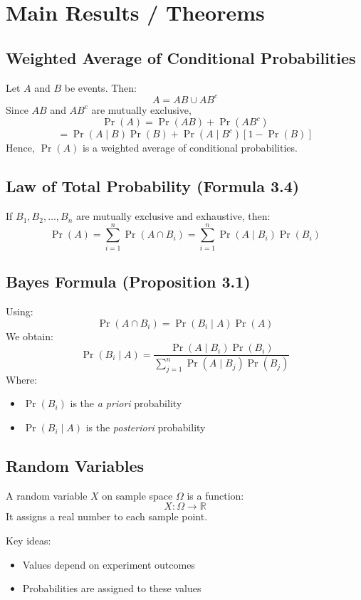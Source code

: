 \documentclass[12pt]{article}
\begin{document}
\section{Main Results / Theorems}

\subsection{Weighted Average of Conditional Probabilities}
Let $A$ and $B$ be events. Then:
\[
A = AB \cup AB^c
\]
Since $AB$ and $AB^c$ are mutually exclusive,
\[
\Pr(A) = \Pr(AB) + \Pr(AB^c)
\]
\[
= \Pr(A \mid B)\Pr(B) + \Pr(A \mid B^c)[1 - \Pr(B)]
\]
Hence, $\Pr(A)$ is a weighted average of conditional probabilities.

\subsection{Law of Total Probability (Formula 3.4)}
If $B_1, B_2, \dots, B_n$ are mutually exclusive and exhaustive, then:
\[
\Pr(A) = \sum_{i=1}^n \Pr(A \cap B_i)
= \sum_{i=1}^n \Pr(A \mid B_i)\Pr(B_i)
\]

\subsection{Bayes Formula (Proposition 3.1)}
Using:
\[
\Pr(A \cap B_i) = \Pr(B_i \mid A)\Pr(A)
\]
We obtain:
\[
\Pr(B_i \mid A) =
\frac{\Pr(A \mid B_i)\Pr(B_i)}
{\sum_{j=1}^n \Pr(A \mid B_j)\Pr(B_j)}
\]
Where:
\begin{itemize}[noitemsep]
\item $\Pr(B_i)$ is the \textit{a priori} probability
\item $\Pr(B_i \mid A)$ is the \textit{posteriori} probability
\end{itemize}

\subsection{Random Variables}
A random variable $X$ on sample space $\Omega$ is a function:
\[
X : \Omega \rightarrow \mathbb{R}
\]
It assigns a real number to each sample point.

Key ideas:
\begin{itemize}[noitemsep]
\item Values depend on experiment outcomes
\item Probabilities are assigned to these values
\end{itemize}
\end{document}
